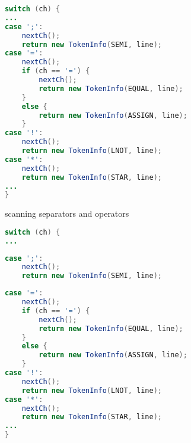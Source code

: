 \documentclass[8pt,a4paper,compress]{beamer}
\begin{document}
\begin{frame}[fragile]
\pause

\begin{overprint}
\begin{tcolorbox}[enhanced,drop shadow southwest,sharp corners,size=fbox,colback=white,fontlower=\small\ttfamily,collower=silver900]

\begin{lstlisting}[language=Java,style=focusin]
switch (ch) {
...
case ';':
    nextCh();             
    return new TokenInfo(SEMI, line);         
case '=':             
    nextCh();             
    if (ch == '=') {                 
        nextCh();                 
        return new TokenInfo(EQUAL, line);             
    }             
    else {                 
        return new TokenInfo(ASSIGN, line);             
    }         
case '!':             
    nextCh();             
    return new TokenInfo(LNOT, line);         
case '*':             
    nextCh();             
    return new TokenInfo(STAR, line);
...
}
\end{lstlisting}

\tcblower
\begin{minipage}[t][.25cm][t]{\textwidth}
scanning separators and operators
\end{minipage}
\end{tcolorbox}

\begin{tcolorbox}[enhanced,drop shadow southwest,sharp corners,size=fbox,colback=white,fontlower=\small\ttfamily,collower=silver900]

\begin{lstlisting}[language=Java,style=focusout]
switch (ch) {
...
\end{lstlisting}
\begin{lstlisting}[language=Java,style=focusin,backgroundcolor=\color{lime100}]
case ';':
    nextCh();             
    return new TokenInfo(SEMI, line);         
\end{lstlisting}
\begin{lstlisting}[language=Java,style=focusout]
case '=':             
    nextCh();             
    if (ch == '=') {                 
        nextCh();                 
        return new TokenInfo(EQUAL, line);             
    }             
    else {                 
        return new TokenInfo(ASSIGN, line);             
    }         
case '!':             
    nextCh();             
    return new TokenInfo(LNOT, line);         
case '*':             
    nextCh();             
    return new TokenInfo(STAR, line);
...
}
\end{lstlisting}


\end{tcolorbox}
\end{overprint}
\end{frame}
\end{document}
